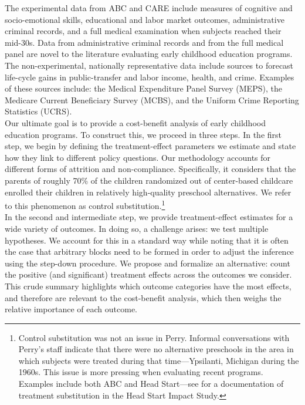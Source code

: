 \noindent The experimental data from ABC and CARE include measures of cognitive and socio-emotional skills, educational and labor market outcomes, administrative criminal records, and a full medical examination when subjects reached their mid-30s. Data from administrative criminal records and from the full medical panel are novel to the literature evaluating early childhood education programs. The non-experimental, nationally representative data include sources to forecast life-cycle gains in public-transfer and labor income, health, and crime. Examples of these sources include: the Medical Expenditure Panel Survey (MEPS), the Medicare Current Beneficiary Survey (MCBS), and the Uniform Crime Reporting Statistics (UCRS).\\

\noindent Our ultimate goal is to provide a cost-benefit analysis of early childhood education programs. To construct this, we proceed in three steps. In the first step, we begin by defining the treatment-effect parameters we estimate and state how they link to different policy questions. Our methodology accounts for different forms of attrition and non-compliance. Specifically, it considers that the parents of roughly 70\% of the children randomized out of center-based childcare enrolled their children in relatively high-quality preschool alternatives. We refer to this phenomenon as control substitution.\footnote{Control  substitution was not an issue in Perry. Informal conversations with Perry's staff indicate that there were no alternative preschools in the area in which subjects were treated during that time---Ypsilanti, Michigan during the 1960s. This issue is more pressing when evaluating recent programs. Examples include both ABC and Head Start---see \citep{Puma_Bell_etal_2010_HeadStartImpact} for a documentation of treatment substitution in the Head Start Impact Study.}\\

\noindent In the second and intermediate step, we provide treatment-effect estimates for a wide variety of outcomes. In doing so, a challenge arises: we test multiple hypotheses. We account for this in a standard way \citep{Lehman_Romano_2005_AnnStat,Romano_Shaikh_2006_AnnStat} while noting that it is often the case that arbitrary blocks need to be formed in order to adjust the inference using the step-down procedure. We propose and formalize an alternative: count the positive (and significant) treatment effects across the outcomes we consider. This crude summary highlights which outcome categories have the most effects, and therefore are relevant to the cost-benefit analysis, which then weighs the relative importance of each outcome.\\ 


